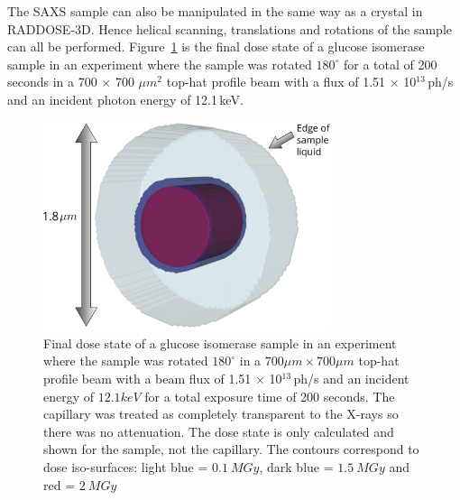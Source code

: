 The SAXS sample can also be manipulated in the same way as a crystal in RADDOSE-3D.
Hence helical scanning, translations and rotations of the sample can all be performed.
Figure~\ref{fig:SAXS cylinder rotated} is the final dose state of a glucose isomerase sample in an experiment where the sample was rotated $180^{\circ}$ for a total of 200 seconds in a 700 $\times$ 700 $\mu m^{\text{2}}$ top-hat profile beam with a flux of 1.51 $\times$ 10$^{\text{13}}\,$ph/s and an incident photon energy of 12.1$\,$keV.
\begin{figure}
    \centering
    \includegraphics[width=0.75\textwidth]{figures/saxs/SAXScylinder.pdf}
    \caption{Final dose state of a glucose isomerase sample in an experiment where the sample was rotated $180^{\circ}$ in a $ 700 \mu m \times 700 \mu m $ top-hat profile beam with a beam flux of 1.51 $\times$ 10$^{\text{13}}\,$ph/s and an incident energy of $ 12.1 keV $ for a total exposure time of 200 seconds.
    The capillary was treated as completely transparent to the X-rays so there was no attenuation.
    The dose state is only calculated and shown for the sample, not the capillary.
    The contours correspond to dose iso-surfaces: light blue = $ 0.1\ MGy $, dark blue = $ 1.5\ MGy $ and red = $ 2\ MGy $ }
    \label{fig:SAXS cylinder rotated}
\end{figure}
